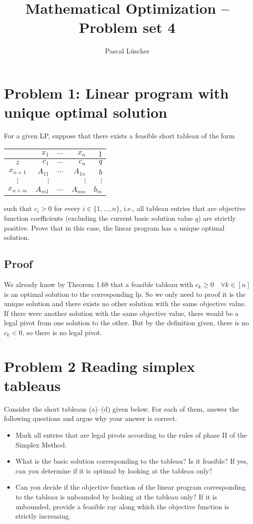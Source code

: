 \documentclass[12pt, a4]{article}
\author{Pascal Lüscher}
\title{Mathematical Optimization – Problem set 4}
\begin{document}
	\section{Problem 1: Linear program with unique optimal solution}
For a given LP, suppose that there exists a feasible short tableau of the form
\begin{center}
	\begin{tabular}{c|rcr|r}
		&$x_1 $&$ \ldots$&$x_n$ & $1$\\
		\hline
		$z$ & $c_1$ & $\ldots$ & $c_n$ & $q$ \\
		\hline
		$x_{n+1}$ & $A_{11}$ & $\ldots$ & $A_{1n}$ & $b$ \\
		$\vdots$ & $\vdots$ && $\vdots$ & $\vdots$ \\
		$x_{n+m} $ & $A_{m1}$ & $\ldots$ & $A_{mn}$ & $b_m$	
	\end{tabular}
\end{center}
	such that $c_i>0$ for every $i\in \{1, \ldots , n\}$, i.e., all tableau entries that are objective function coefficients (excluding the current basic solution value $q$) are strictly positive. Prove that in this case, the linear program has a unique optimal solution.

\subsection{Proof}
We already know by Theorem 1.68 that a feasible tableau with $c_k \geq 0 \quad\forall k \in [n]$ is an optimal solution to the corresponding lp. So we only need to proof it is the unique solution and there exists no other solution with the same objective value.
If there were another solution with the same objective value, there would be a legal pivot from one solution to the other. But by the definition given, there is no $c_k <0$, so there is no legal pivot.

\section{Problem 2 Reading simplex tableaus}

\newcommand{\legalPivot}[1]{{\color{legalPivotColor}\fbox{#1}}}
	
Consider the short tableaus (a)–(d) given below. For each of them, answer the following questions and argue why your answer is correct.
\begin{itemize}
	\item {\color{legalPivotColor} Mark all entries that are legal pivots according to the rules of phase II of the Simplex Method.}
	\item What is the basic solution corresponding to the tableau? Is it feasible? If yes, can you determine if it is optimal by looking at the tableau only?
	\item Can you decide if the objective function of the linear program corresponding to the tableau is unbounded by looking at the tableau only? If it is unbounded, provide a feasible ray along which the objective function is strictly increasing.
\end{itemize}
\end{document}
